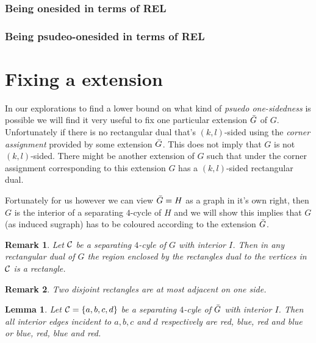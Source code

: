 \documentclass[a4paper]{article}
\newtheorem{lemma}{Lemma}
\newtheorem{remark}{Remark}
\theoremstyle{definition}
\newcommand{\braces}[1]{\left\lbrace {#1} \right\rbrace}
\begin{document}
\subsubsection{Being onesided in terms of REL}

\subsubsection{Being psudeo-onesided in terms of REL}

\section{Fixing a extension}
In our explorations to find a lower bound on what kind of \emph{psuedo one-sidedness} is possible we will find it very useful to fix one particular extension $\bar{G}$ of $G$. Unfortunately if there is no rectangular dual that’s $(k,l)$-sided using the \emph{corner assignment} provided by some extension $\bar{G}$. This does not imply that $G$ is not $(k,l)$-sided. There might be another extension of $G$ such that under the corner assignment corresponding to this extension $G$ has a $(k,l)$-sided rectangular dual. 

Fortunately for us however we can view $\bar{G} = H$ as a graph in it's own right, then $G$ is the interior of a separating $4$-cycle of $H$ and we will show this implies that $G$ (as induced sugraph) has to be coloured according to the extension $\bar{G}$. 

\begin{remark}
\label{re:interiorRectangle}
Let $\mathcal{C}$ be a separating $4$-cyle of $G$ with interior $I$. Then in any rectangular dual of $G$ the region enclosed by the rectangles dual to the vertices in $\mathcal{C}$ is a rectangle.
\end{remark}

\begin{remark}
\label{re:disjointRectanglesOnlyHaveOneAdjecentSide}
Two disjoint rectangles are at most adjacent on one side.
\end{remark}

\begin{lemma}
\label{lem:fourCycleUnicolor}
Let $\C = \braces{a, b, c, d}$ be a separating $4$-cyle of $\bar{G}$ with interior $I$. Then all interior edges incident to $a, b, c$ and $d$ respectively are red, blue, red and blue or blue, red, blue and red.
\end{lemma}
\end{document}

